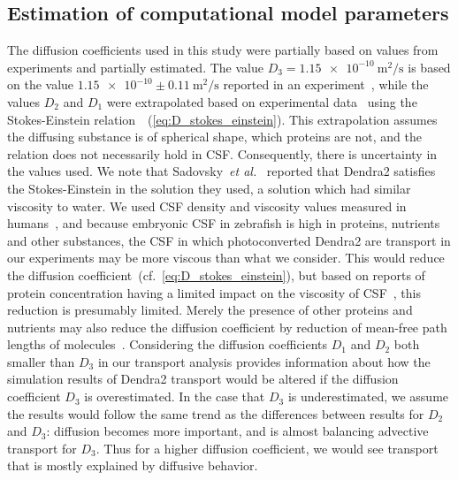 \documentclass[fleqn]{wlscirep}
\begin{document}
\subsection*{Estimation of computational model parameters}
The diffusion coefficients used in this study were partially based on values from experiments and partially estimated. The value $D_3=\num{1.15e-10} \ \mathrm{m^2/s}$ is based on the value $\num{1.15e-10} \pm 0.11 \ \mathrm{m^2/s}$ reported in an experiment~\cite{GuraSadovsky2017MeasurementExpansion}, while the values $D_2$ and $D_1$ were extrapolated based on experimental data~\cite{Swaminathan1997PhotobleachingDiffusion, Potma2001ReducedCells, Mahmood2023ExosomeTemperature} using the Stokes-Einstein relation~\cite{Einstein1905UberTeilchen}~(\cref{eq:D_stokes_einstein}). This extrapolation assumes the diffusing substance is of spherical shape, which proteins are not, and the relation does not necessarily hold in CSF. Consequently, there is uncertainty in the values used. We note that Sadovsky~\emph{et al.}~\cite{GuraSadovsky2017MeasurementExpansion} reported that Dendra2 satisfies the Stokes-Einstein in the solution they used, a solution which had similar viscosity to water. We used CSF density and viscosity values measured in humans~\cite{Bloomfield1998EffectsFluid}, and because embryonic CSF in zebrafish is high in proteins, nutrients and other substances, the CSF in which photoconverted Dendra2 are transport in our experiments may be more viscous than what we consider. This would reduce the diffusion coefficient~(cf.~\cref{eq:D_stokes_einstein}), but based on reports of protein concentration having a limited impact on the viscosity of CSF~\cite{Bloomfield1998EffectsFluid, Brydon1995PhysicalViscosity}, this reduction is presumably limited. Merely the presence of other proteins and nutrients may also reduce the diffusion coefficient by reduction of mean-free path lengths of molecules~\cite{Cussler2009Diffusion:Systems}. Considering the diffusion coefficients $D_1$ and $D_2$ both smaller than $D_3$ in our transport analysis provides information about how the simulation results of Dendra2 transport would be altered if the diffusion coefficient $D_3$ is overestimated. In the case that $D_3$ is underestimated, we assume the results would follow the same trend as the differences between results for $D_2$ and $D_3$: diffusion becomes more important, and is almost balancing advective transport for $D_3$. Thus for a higher diffusion coefficient, we would see transport that is mostly explained by diffusive behavior.
\end{document}
